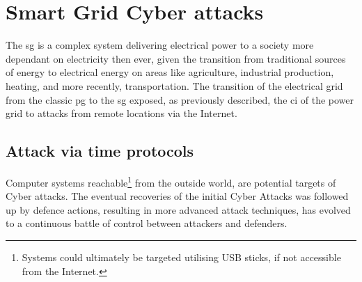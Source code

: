 



\chapter{Smart Grid Cyber attacks}















The \acrfull{sg} is a complex system delivering electrical power to a society more dependant on electricity then ever, given the transition from traditional sources of energy to electrical energy on areas like agriculture, industrial production, heating, and more recently, transportation.
The transition of the electrical grid from the classic \acrlong{pg} to the \acrlong{sg} exposed, as previously described, the \acrlong{ci} of the power grid to attacks from remote locations via the Internet. 


\section{Attack via time protocols}

Computer systems reachable\footnote{Systems could ultimately be targeted utilising USB sticks, if not accessible from the Internet.} from the outside world,  are potential targets of Cyber attacks. The eventual recoveries of the initial Cyber Attacks was followed up by defence actions, resulting in more advanced attack techniques, has evolved to a continuous battle of control between attackers and defenders. \\



